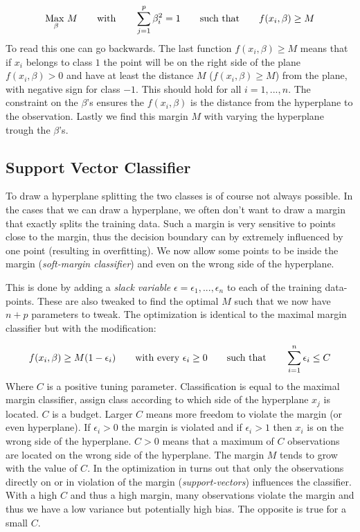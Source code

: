 \documentclass{article}
\begin{document}
\begin{align*}
    \underset{\beta}{\text{Max }} M \hspace{20px}\text{with} \hspace{20px}\sum_{j=1}^{p} \beta_i^2 = 1 \hspace{20px}\text{such that}\hspace{20px}f(x_i, \beta) \geq M
\end{align*}
To read this one can go backwards. The last function $f(x_i, \beta) \geq M$ means that if $x_i$ belongs to class $1$ the point will be on the right side of the plane $f(x_i, \beta) > 0$ and have at least the distance $M$ ($f(x_i, \beta) \geq M$) from the plane, with negative sign for class $-1$. This should hold for all $i = 1, ... , n$. The constraint on the $\beta$'s ensures the $f(x_i, \beta)$ is the distance from the hyperplane to the observation. Lastly we find this margin $M$ with varying the hyperplane trough the $\beta$'s. 
 
\subsection{Support Vector Classifier}
To draw a hyperplane splitting the two classes is of course not always possible. In the cases that we can draw a hyperplane, we often don't want to draw a margin that exactly splits the training data. Such a margin is very sensitive to points close to the margin, thus the decision boundary can by extremely influenced by one point (resulting in overfitting). We now allow some points to be inside the margin (\textit{soft-margin classifier}) and even on the wrong side of the hyperplane.

This is done by adding a \textit{slack variable} $\epsilon = \epsilon_1, ... , \epsilon_n$ to each of the training data-points. These are also tweaked to find the optimal $M$ such that we now have $n+p$ parameters to tweak. The optimization is identical to the maximal margin classifier but with the modification:

\begin{align*}
    f(x_i, \beta) \geq M(1-\epsilon_i) \hspace{20px}\text{with every } \epsilon_i \geq 0 \hspace{20px}\text{such that}\hspace{20px}\sum_{i=1}^{n}\epsilon_i \leq C
\end{align*}
Where $C$ is a positive tuning parameter. Classification is equal to the maximal margin classifier, assign class according to which side of the hyperplane $x_j$ is located. $C$ is a budget. Larger $C$ means more freedom to violate the margin (or even hyperplane). If $\epsilon_i > 0$ the margin is violated and if $\epsilon_i > 1$ then $x_i$ is on the wrong side of the hyperplane. $C > 0$ means that a maximum of $C$ observations are located on the wrong side of the hyperplane. The margin $M$ tends to grow with the value of $C$. In the optimization in turns out that only the observations directly on or in violation of the margin (\textit{support-vectors}) influences the classifier. With a high $C$ and thus a high margin, many observations violate the margin and thus we have a low variance but potentially high bias. The opposite is true for a small $C$.
\end{document}
